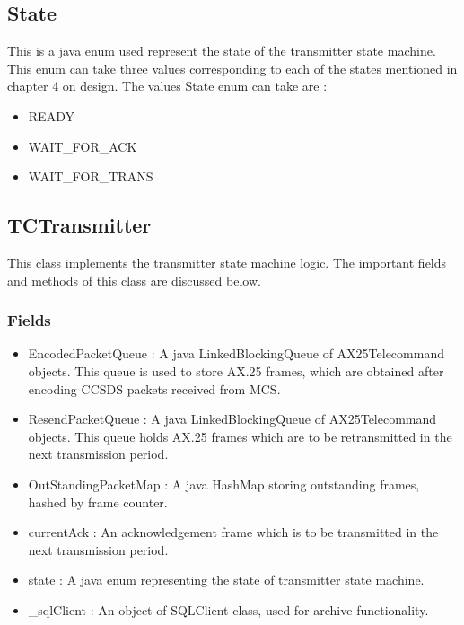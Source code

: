 \documentclass[BTech]{iitmdiss}
\begin{document}
\subsection{State}
This is a java enum used represent the state of the transmitter state machine. This enum can take three values corresponding to each of the states mentioned in chapter 4 on design. The values State enum can take are : 
\begin{itemize}
\item READY 
\item WAIT\_FOR\_ACK
\item WAIT\_FOR\_TRANS 
\end{itemize}

\subsection{TCTransmitter}
This class implements the transmitter state machine logic. The important fields and methods of this class are discussed below.
\subsubsection{Fields}
\begin{itemize}
\item EncodedPacketQueue : A java LinkedBlockingQueue of AX25Telecommand objects. This queue is used to store AX.25 frames, which are obtained after encoding CCSDS packets received from MCS.
\item ResendPacketQueue : A java LinkedBlockingQueue of AX25Telecommand objects. This queue holds AX.25 frames which are to be retransmitted in the next transmission period.
\item OutStandingPacketMap : A java HashMap storing outstanding frames, hashed by frame counter.
\item currentAck : An acknowledgement frame which is to be transmitted in the next transmission period.
\item state : A java enum representing the state of transmitter state machine.
\item \_sqlClient : An object of SQLClient class, used for archive functionality. 
\end{itemize}
\end{document}
